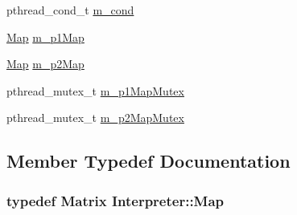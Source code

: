 \begin{DoxyCompactItemize}
\item 
pthread\_\-cond\_\-t \hyperlink{classInterpreter_a9239b5f00f922f05a3902538784f5777}{m\_\-cond}
\item 
\hyperlink{classMatrix}{Map} \hyperlink{classInterpreter_a4c923fac8d283ef70a03812fce74ef47}{m\_\-p1Map}
\item 
\hyperlink{classMatrix}{Map} \hyperlink{classInterpreter_a9704ad86fdf8eddecfe191d8540fb4ef}{m\_\-p2Map}
\item 
pthread\_\-mutex\_\-t \hyperlink{classInterpreter_a849d1195573a32632ae33cd7ecd4bec7}{m\_\-p1MapMutex}
\item 
pthread\_\-mutex\_\-t \hyperlink{classInterpreter_a76012913dbff07096d081b2380c2c7a8}{m\_\-p2MapMutex}
\end{DoxyCompactItemize}


\subsection{Member Typedef Documentation}
\hypertarget{classInterpreter_a4c080f069f557cf92dfe803117a6ea53}{
\subsubsection[{Map}]{\setlength{\rightskip}{0pt plus 5cm}typedef {\bf Matrix} {\bf Interpreter::Map}}}
\label{classInterpreter_a4c080f069f557cf92dfe803117a6ea53}


